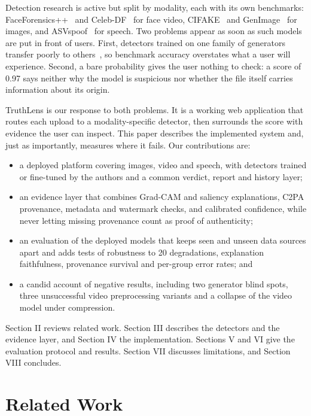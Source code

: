 \documentclass[conference]{IEEEtran}
\begin{document}
Detection research is active but split by modality, each with its own benchmarks: FaceForensics++~\cite{ffpp} and Celeb-DF~\cite{celebdf} for face video, CIFAKE~\cite{cifake} and GenImage~\cite{genimage} for images, and ASVspoof~\cite{asvspoof2019} for speech. Two problems appear as soon as such models are put in front of users. First, detectors trained on one family of generators transfer poorly to others~\cite{wang2020,ojha2023,genimage}, so benchmark accuracy overstates what a user will experience. Second, a bare probability gives the user nothing to check: a score of 0.97 says neither why the model is suspicious nor whether the file itself carries information about its origin.

TruthLens is our response to both problems. It is a working web application that routes each upload to a modality-specific detector, then surrounds the score with evidence the user can inspect. This paper describes the implemented system and, just as importantly, measures where it fails. Our contributions are:

\begin{itemize}
\item a deployed platform covering images, video and speech, with detectors trained or fine-tuned by the authors and a common verdict, report and history layer;
\item an evidence layer that combines Grad-CAM and saliency explanations, C2PA provenance, metadata and watermark checks, and calibrated confidence, while never letting missing provenance count as proof of authenticity;
\item an evaluation of the deployed models that keeps seen and unseen data sources apart and adds tests of robustness to 20 degradations, explanation faithfulness, provenance survival and per-group error rates; and
\item a candid account of negative results, including two generator blind spots, three unsuccessful video preprocessing variants and a collapse of the video model under compression.
\end{itemize}

Section II reviews related work. Section III describes the detectors and the evidence layer, and Section IV the implementation. Sections V and VI give the evaluation protocol and results. Section VII discusses limitations, and Section VIII concludes.


\section{Related Work}
\end{document}
